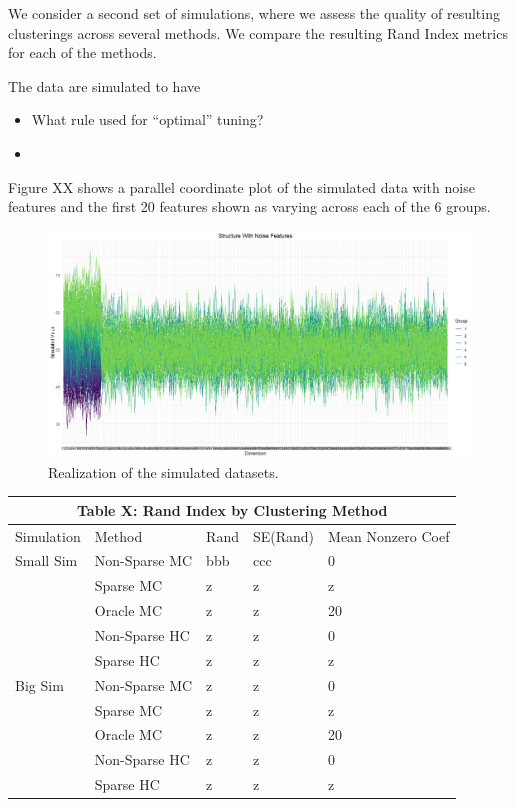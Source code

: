 \documentclass[
]{article}
\providecommand{\tightlist}{%
  \setlength{\itemsep}{0pt}\setlength{\parskip}{0pt}}
\begin{document}
We consider a second set of simulations, where we assess the quality of
resulting clusterings across several methods. We compare the resulting
Rand Index metrics for each of the methods.

The data are simulated to have

\begin{itemize}
\tightlist
\item
  What rule used for ``optimal'' tuning?
\item
\end{itemize}

Figure XX shows a parallel coordinate plot of the simulated data with
noise features and the first 20 features shown as varying across each of
the 6 groups.

\begin{figure}
\includegraphics[width=0.9\linewidth]{SimulatedRealization} \caption{Realization of the simulated datasets.}\label{fig:SimulationRealized}
\end{figure}

\begin{tabular}{ |p{3cm} |p{3cm}|p{3cm}|p{3cm}|p{3.5cm}|  }
 \hline
 \multicolumn{5}{|c|}{Table X: Rand Index by Clustering Method} \\
 \hline
Simulation & Method & Rand & SE(Rand) & Mean Nonzero Coef \\
 \hline
Small Sim & Non-Sparse MC  & bbb    & ccc &   0 \\
~ & Sparse MC & z & z & z \\
~ & Oracle MC & z & z & 20 \\
~ & Non-Sparse HC & z & z & 0 \\
~ & Sparse HC & z & z & z \\
 \hline
 Big Sim & Non-Sparse MC & z & z & 0 \\
~ & Sparse MC & z & z & z \\
~ & Oracle MC & z & z & 20 \\
~ & Non-Sparse HC & z & z & 0 \\
~ & Sparse HC & z & z & z \\
 
  \hline
\end{tabular}
\end{document}
